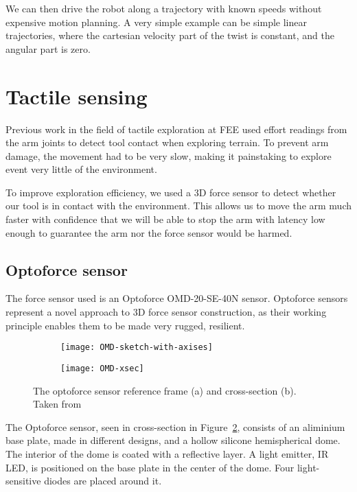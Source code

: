 \documentclass[buriama8_dp.tex]{subfiles}
\begin{document}
We can then drive the robot along a trajectory with known speeds without expensive motion planning. A very simple example can be simple linear trajectories, where the cartesian velocity part of the twist is constant, and the angular part is zero.

\section{Tactile sensing}

Previous work in the field of tactile exploration at FEE \cite{vojta} used effort readings from the arm joints to detect tool contact when exploring terrain. To prevent arm damage, the movement had to be very slow, making it painstaking to explore event very little of the environment.

To improve exploration efficiency, we used a 3D force sensor to detect whether our tool is in contact with the environment. This allows us to move the arm much faster with confidence that we will be able to stop the arm with latency low enough to guarantee the arm nor the force sensor would be harmed.

\subsection{Optoforce sensor}
\label{subsec:opto}

The force sensor used is an Optoforce OMD-20-SE-40N sensor. Optoforce sensors represent a novel approach to 3D force sensor construction, as their working principle enables them to be made very rugged, resilient.

\begin{figure}[ht]
  \begin{subfigure}[t]{0.4\textwidth}
    \texttt{[image: OMD-sketch-with-axises]}
    \caption{}
    \label{fig:omd_geom}
  \end{subfigure}
  \begin{subfigure}[t]{0.4\textwidth}
    \texttt{[image: OMD-xsec]}
    \caption{}
    \label{fig:omd_xsec}
  \end{subfigure}

  \caption[Optoforce sensor]{The optoforce sensor reference frame (a) and cross-section (b). Taken from \cite{opto_whitep}}
  \label{fig:decomps}
\end{figure}

The Optoforce sensor, seen in cross-section in Figure~\ref{fig:omd_xsec}, consists of an aliminium base plate, made in different designs, and a hollow silicone hemispherical dome. The interior of the dome is coated with a reflective layer. A light emitter, IR LED, is positioned on the base plate in the center of the dome. Four light-sensitive diodes are placed around it.
\end{document}
